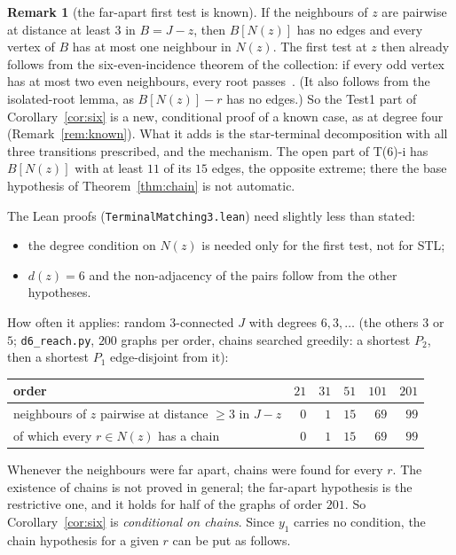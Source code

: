 \documentclass[11pt]{amsart}
\theoremstyle{definition}
\newtheorem{remark}[theorem]{Remark}
\begin{document}
\begin{remark}[the far-apart first test is known]\label{rem:known6}
If the neighbours of $z$ are pairwise at distance at least $3$ in $B=J-z$, then $B[N(z)]$ has no
edges and every vertex of $B$ has at most one neighbour in $N(z)$. The first test at $z$ then
already follows from the six-even-incidence theorem of the collection: if every odd vertex has at
most two even neighbours, every root passes~\cite[Theorem~1(2)]{INC}. (It also follows from the
isolated-root lemma, as $B[N(z)]-r$ has no edges.) So the Test1 part of Corollary~\ref{cor:six} is
a new, conditional proof of a known case, as at degree four (Remark~\ref{rem:known}). What it
adds is the star-terminal decomposition with all three transitions prescribed, and the
mechanism. The open part of T(6)-i has $B[N(z)]$ with at least $11$ of its $15$ edges, the
opposite extreme; there the base hypothesis of Theorem~\ref{thm:chain} is not automatic.
\end{remark}
The Lean proofs (\texttt{TerminalMatching3.lean}) need slightly less than stated:
\begin{itemize}
\item the degree condition on $N(z)$ is needed only for the first test, not for STL;
\item $d(z)=6$ and the non-adjacency of the pairs follow from the other hypotheses.
\end{itemize}
How often it applies:
random $3$-connected $J$ with degrees $6,3,\dots$ (the others $3$ or $5$; \texttt{d6\_reach.py},
$200$ graphs per order, chains searched greedily: a shortest $P_2$, then a shortest $P_1$
edge-disjoint from it):
\begin{center}\footnotesize
\begin{tabular}{@{}lrrrrr@{}}
\toprule
order & $21$ & $31$ & $51$ & $101$ & $201$\\
\midrule
neighbours of $z$ pairwise at distance $\ge3$ in $J-z$ & $0$ & $1$ & $15$ & $69$ & $99$\\
\quad of which every $r\in N(z)$ has a chain & $0$ & $1$ & $15$ & $69$ & $99$\\
\bottomrule
\end{tabular}
\end{center}
Whenever the neighbours were far apart, chains were found for every $r$. The existence of
chains is not proved in general; the far-apart hypothesis is the restrictive one, and it holds
for half of the graphs of order $201$. So Corollary~\ref{cor:six} is \emph{conditional on
chains}. Since $y_1$ carries no condition, the chain hypothesis for a given $r$ can be put as
follows.
\end{document}
